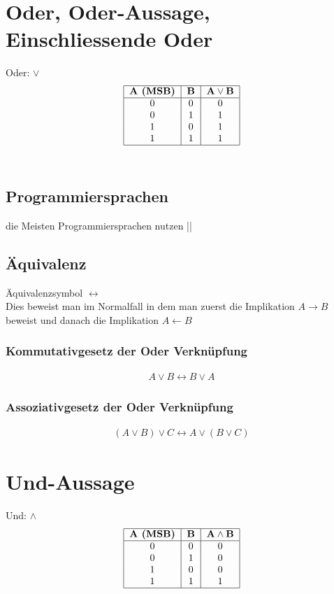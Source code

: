 \documentclass[a4paper]{scrartcl}
\begin{document}
\section{Oder, Oder-Aussage, Einschliessende Oder}
Oder: $\vee$ \\

\begin{align}
\begin{tabular}{|c|c|c|}
\hline
\textbf{A (MSB)} & \textbf{B} & $\bf{A \vee B }$ \\
\hline
0&0&0 \\
0&1&1 \\
1&0&1 \\
1&1&1 \\
\hline
\end{tabular}
\end{align} \\

\subsection{Programmiersprachen}
die Meisten Programmiersprachen nutzen ||

\subsection{Äquivalenz}
Äquivalenzsymbol $\leftrightarrow$ \\
Dies beweist man im Normalfall in dem man zuerst die Implikation $A \rightarrow B$ beweist und danach die Implikation $A \leftarrow B $ \\

\subsubsection{Kommutativgesetz der Oder Verknüpfung}
\begin{align}
A \vee B \leftrightarrow B \vee A
\end{align}

\subsubsection{Assoziativgesetz der Oder Verknüpfung}
\begin{align}
(A \vee B) \vee C \leftrightarrow A \vee (B \vee C)
\end{align}

\section{Und-Aussage}
Und: $\wedge$ \\
\begin{align}
\begin{tabular}{|c|c|c|}
\hline
\textbf{A (MSB)} & \textbf{B} & $\bf{A \wedge B }$ \\
\hline
0&0&0 \\
0&1&0 \\
1&0&0 \\
1&1&1 \\
\hline
\end{tabular}
\end{align} \\
\end{document}
